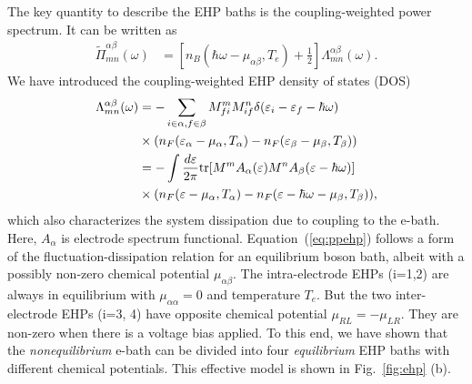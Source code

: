 \documentclass[aps,prb,
,floatfix,footinbib,shortbibliography,
preprint
]{revtex4-1}
\begin{document}
The key quantity to describe the EHP baths is the coupling-weighted power spectrum. It can be written as
\begin{align}
\tilde{\Pi}_{mn}^{\alpha\beta}(\omega) &= \left[n_B(\hbar\omega-\mu_{\alpha\beta},T_e)+\frac{1}{2}\right]\Lambda_{mn}^{\alpha\beta}(\omega).
\label{eq:ppehp}
\end{align}
We have introduced the coupling-weighted EHP density of states (DOS)\cite{lu_current-induced_2012,lu2016electron}
\begin{align}
\Lambda_{mn}^{\alpha\beta}(\omega) &= -\sum_{i\in\alpha,f\in\beta}M^{m}_{fi}M^n_{if}  \delta(\varepsilon_i-\varepsilon_f-\hbar\omega)\nonumber\\
&\times (n_F(\varepsilon_\alpha-\mu_\alpha,T_\alpha)-n_F(\varepsilon_\beta-\mu_\beta,T_\beta))\nonumber\\
&=-\int \frac{d\varepsilon}{2\pi} {\rm tr}[M^m A_\alpha(\varepsilon) M^n A_\beta(\varepsilon-\hbar\omega)] \nonumber\\
&\times (n_F(\varepsilon-\mu_\alpha,T_\alpha)-n_F(\varepsilon-\hbar\omega-\mu_\beta,T_\beta)),
\label{eq:gamma}
\end{align}
which also characterizes the system dissipation due to coupling to the e-bath\cite{lu_current-induced_2012}. Here, $A_\alpha$ is electrode spectrum functional.
Equation~(\ref{eq:ppehp}) follows a form of the fluctuation-dissipation relation for an equilibrium boson bath, albeit with a possibly non-zero chemical potential  $\mu_{\alpha\beta}$. The intra-electrode EHPs (i=1,2) are always in equilibrium with $\mu_{\alpha\alpha}=0$ and temperature $T_e$. But the two inter-electrode EHPs (i=3, 4) have opposite chemical potential $\mu_{RL}=-\mu_{LR}$. They are non-zero when there is a voltage bias applied.  To this end, we have shown that the \emph{nonequilibrium} e-bath can be divided into four \emph{equilibrium} EHP baths with different chemical potentials.
This effective model is shown in Fig.~\ref{fig:ehp} (b).
\end{document}
